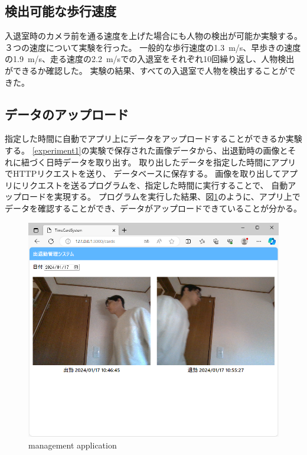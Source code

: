 \documentclass[10pt]{jarticle}
\begin{document}
    \subsection{検出可能な歩行速度}
    入退室時のカメラ前を通る速度を上げた場合にも人物の検出が可能か実験する。
    ３つの速度について実験を行った。
    一般的な歩行速度の1.3~m/s、早歩きの速度の1.9~m/s、走る速度の2.2~m/sでの入退室をそれぞれ10回繰り返し、人物検出ができるか確認した。 
    実験の結果、すべての入退室で人物を検出することができた。


    \subsection{データのアップロード}

指定した時間に自動でアプリ上にデータをアップロードすることができるか実験する。
\ref{experiment1}の実験で保存された画像データから、出退勤時の画像とそれに紐づく日時データを取り出す。
取り出したデータを指定した時間にアプリでHTTPリクエストを送り、
データベースに保存する。
画像を取り出してアプリにリクエストを送るプログラムを、指定した時間に実行することで、
自動アップロードを実現する。
プログラムを実行した結果、図\ref{application}のように、アプリ上でデータを確認することができ、データがアップロードできていることが分かる。
\begin{figure}[!h]
    \centering
    \includegraphics[width=1.0\linewidth]{fig/application.png}
    \caption{management application}
    \label{application}
    \end{figure}
\end{document}
